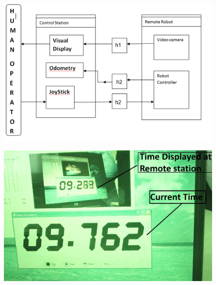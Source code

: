  \begin{figure}[ht]
 	\centering
 	\begin{minipage}{0.55\textwidth}
 		\centering
 		\includegraphics[width=.9\linewidth,keepaspectratio]{Chapter7/fig/BlockTimeDelay}
 		\label{fig:blockdigTimeDelay}
 	\end{minipage}
  	\begin{minipage}{0.40\textwidth}
 	\centering
 	\includegraphics[width=\linewidth,keepaspectratio]{Chapter7/fig/delayMeasureNew}
 	\label{fig:delayphoto}
 \end{minipage}%
 \end{figure} 



